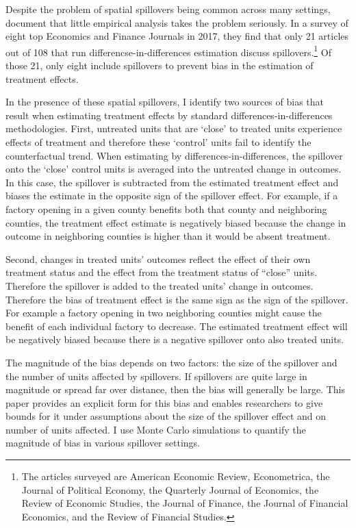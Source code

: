 \documentclass[11pt]{article}
\begin{document}
Despite the problem of spatial spillovers being common across many settings, \citet{Berg_Streitz_2019} document that little empirical analysis takes the problem seriously. In a survey of eight top Economics and Finance Journals in 2017, they find that only 21 articles out of 108 that run differencse-in-differences estimation discuss spillovers.\footnote{The articles surveyed are American Economic Review, Econometrica, the Journal of Political Economy, the Quarterly Journal of Economics, the Review of Economic Studies, the Journal of Finance, the Journal of Financial Economics, and the Review of Financial Studies.} Of those 21, only eight include spillovers to prevent bias in the estimation of treatment effects.

In the presence of these spatial spillovers, I identify two sources of bias that result when estimating treatment effects by standard differences-in-differences methodologies. First, untreated units that are `close' to treated units experience effects of treatment and therefore these `control' units fail to identify the counterfactual trend. When estimating by differences-in-differences, the spillover onto the `close' control units is averaged into the untreated change in outcomes. In this case, the spillover is subtracted from the estimated treatment effect and biases the estimate in the opposite sign of the spillover effect. For example, if a factory opening in a given county benefits both that county and neighboring counties, the treatment effect estimate is negatively biased because the change in outcome in neighboring counties is higher than it would be absent treatment. 

Second, changes in treated units' outcomes reflect the effect of their own treatment status and the effect from the treatment status of ``close'' units. Therefore the spillover is added to the treated units' change in outcomes. Therefore the bias of treatment effect is the same sign as the sign of the spillover. For example a factory opening in two neighboring counties might cause the benefit of each individual factory to decrease. The estimated treatment effect will be negatively biased because there is a negative spillover onto also treated units. 

The magnitude of the bias depends on two factors: the size of the spillover and the number of units affected by spillovers. If spillovers are quite large in magnitude or spread far over distance, then the bias will generally be large. This paper provides an explicit form for this bias and enables researchers to give bounds for it under assumptions about the size of the spillover effect and on number of units affected. I use Monte Carlo simulations to quantify the magnitude of bias in various spillover settings. 
\end{document}
